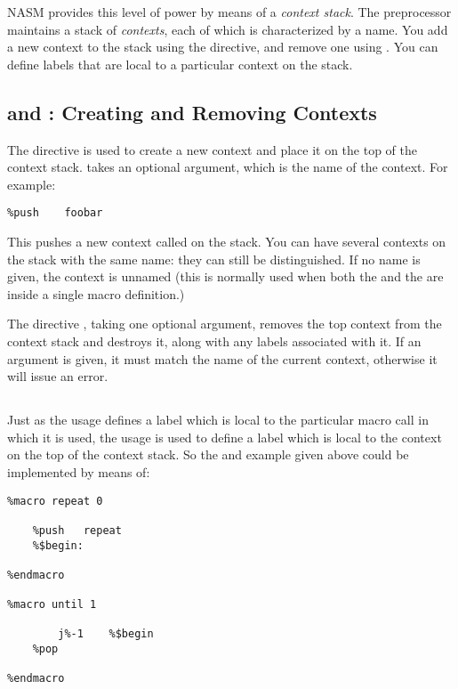 NASM provides this level of power by means of a \emph{context stack}.
The preprocessor maintains a stack of \emph{contexts}, each of which is
characterized by a name. You add a new context to the stack using
the  directive, and remove one using .
You can define labels that are local to a particular context on the stack.

\subsection{ and : Creating and Removing Contexts}
\label{subsec:pushpop}

The  directive is used to create a new context and place it
on the top of the context stack.  takes an optional argument,
which is the name of the context. For example:

\begin{lstlisting}
%push    foobar
\end{lstlisting}

This pushes a new context called  on the stack. You can have
several contexts on the stack with the same name: they can still be
distinguished.  If no name is given, the context is unnamed (this is
normally used when both the  and the  are inside a
single macro definition.)

The directive , taking one optional argument, removes the top
context from the context stack and destroys it, along with any
labels associated with it.  If an argument is given, it must match the
name of the current context, otherwise it will issue an error.

\subsection{}
\label{subsec:ctxlocal}

Just as the usage  defines a label which is local to the
particular macro call in which it is used, the usage \indexcode{\%\$}
is used to define a label which is local to the context on the top
of the context stack. So the  and  example given
above could be implemented by means of:

\begin{lstlisting}
%macro repeat 0

    %push   repeat
    %$begin:

%endmacro

%macro until 1

        j%-1    %$begin
    %pop

%endmacro
\end{lstlisting}

